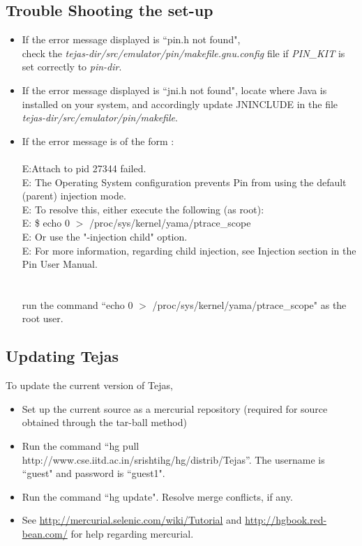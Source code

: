\documentclass[margin=0.1in]{article}
\begin{document}
\subsection*{Trouble Shooting the set-up}

\begin{itemize}

\item
If the error message displayed is ``pin.h not found",\\
check the {\em tejas-dir/src/emulator/pin/makefile.gnu.config} file if {\em PIN\_KIT} is set correctly to {\em pin-dir}.

\item
If the error message displayed is ``jni.h not found", locate where Java is installed on your system, and accordingly update JNINCLUDE in the file {\em tejas-dir/src/emulator/pin/makefile}.

\item
If the error message is of the form :\\
\\
E:Attach to pid 27344 failed.\\
E:  The Operating System configuration prevents Pin from using the default (parent) injection mode.\\
E:  To resolve this, either execute the following (as root):\\
E:  \$ echo 0 $>$ /proc/sys/kernel/yama/ptrace\_scope\\
E:  Or use the "-injection child" option.\\
E:  For more information, regarding child injection, see Injection section in the Pin User Manual.\\
\\
\\
run the command ``echo 0 $>$ /proc/sys/kernel/yama/ptrace\_scope" as the root user.


\end{itemize}

\subsection*{Updating Tejas}
To update the current version of Tejas,
\begin{itemize}
\item
Set up the current source as a mercurial repository (required for source obtained through the tar-ball method)
\item
Run the command ``hg pull http://www.cse.iitd.ac.in/srishtihg/hg/distrib/Tejas''. The username is ``guest" and password is ``guest1".
\item
Run the command ``hg update". Resolve merge conflicts, if any.
\item
See \url{http://mercurial.selenic.com/wiki/Tutorial} and \url{http://hgbook.red-bean.com/} for help regarding mercurial.
\end{itemize}
\end{document}

